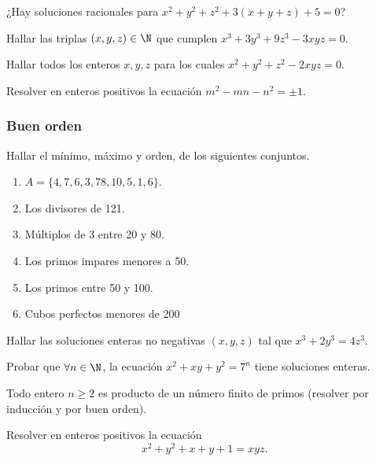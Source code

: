 \begin{problem}
    ¿Hay soluciones racionales para $x^2+ y^2 + z^2 + 3(x+y+z) + 5 = 0$?
\end{problem}

\begin{problem}
    Hallar las triplas $(x,y,z) \in \N$ que cumplen $x^3 + 3y^3 + 9z^3 - 3xyz = 0$.
\end{problem}

\begin{problem}
    Hallar todos los enteros $x,y,z$ para los cuales $x^2 + y^2 + z^2 - 2xyz = 0$.
\end{problem}

\begin{problem}
    Resolver en enteros positivos la ecuación $m^2 - mn - n^2 = \pm 1.$
\end{problem}



\subsubsection{Buen orden}
\begin{exercise}
    Hallar el mínimo, máximo y orden, de los siguientes conjuntos.
    \begin{multicols}{2}
        \begin{enumerate}
            \item $A = \{4,7,6,3,78,10,5, 1,6\}$.
            \item Los divisores de 121.
            \item Múltiplos de 3 entre 20 y 80.
            \item Los primos impares menores a 50.
            \item Los primos entre 50 y 100.
            \item Cubos perfectos menores de 200
        \end{enumerate}
    \end{multicols}
\end{exercise}












\begin{exercise}
    Hallar las soluciones enteras no negativas $(x,y,z)$ tal que $x^3 + 2y^3 = 4z^3$.
\end{exercise}

\begin{problem}
    Probar que $\forall n \in \N$, la ecuación $x^2 + xy + y^2 = 7^n$ tiene soluciones enteras.
\end{problem}




\begin{problem}
    Todo entero $n \geq 2$ es producto de un número finito de primos (resolver por inducción y por buen orden).
\end{problem}

\begin{problem}
    Resolver en enteros positivos la ecuación
    \[
        x^2 + y^2 + x + y + 1 = xyz.
    \]
\end{problem}